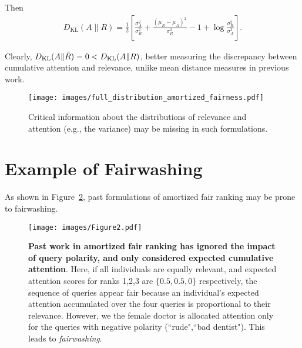 Then 
\begin{align}
D_{\text{KL}}(A \| R) = \frac{1}{2} \left[\frac{\sigma_A^2}{\sigma_R^2} + \frac{(\mu_R - \mu_A)^2}{\sigma_R^2} - 1 + \log \frac{\sigma_R^2}{\sigma_A^2}\right].
\end{align}

Clearly, $D_{\text{KL}}(A \| \Tilde{R}) = 0 < D_{\text{KL}}(A \| R)$, better measuring the discrepancy between cumulative attention and relevance, unlike mean distance measures in previous work.

\begin{figure}[htb!]
\centering
\begin{minipage}[htb!]
{0.4\textwidth}
\texttt{[image: images/full\_distribution\_amortized\_fairness.pdf]}
\caption{Critical information about the distributions of relevance and attention (e.g., the variance) may be missing in such formulations.
}\label{fig:distribution_reliability}
\end{minipage}
\end{figure}

\section{Example of Fairwashing}

As shown in Figure~\ref{fig:fairwashing_amortized_ranking}, past formulations of amortized fair ranking may be prone to fairwashing.

\begin{figure}[htb!]
\centering
\begin{minipage}[htb!]
{0.5\textwidth}
\texttt{[image: images/Figure2.pdf]}
\caption{\textbf{Past work in amortized fair ranking has ignored the impact of query polarity, and only considered expected cumulative attention}. 
Here, if all individuals are equally relevant, and expected attention scores for ranks 1,2,3 are $\{0.5,0.5,0\}$ respectively, the sequence of queries appear fair because an individual's expected attention accumulated over the four queries is proportional to their relevance. However, we the female doctor is allocated attention only for the queries with negative polarity (``rude",``bad dentist"). This leads to \emph{fairwashing}.
}\label{fig:fairwashing_amortized_ranking}
\end{minipage}
\end{figure}






